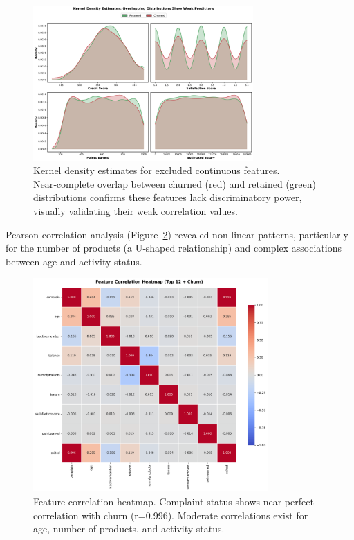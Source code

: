 \documentclass[12pt]{article}
\begin{document}
\begin{figure}[H]
\centering
\includegraphics[width=0.75\textwidth]{../img/poc_kde_plots.png}
\caption{Kernel density estimates for excluded continuous features. Near‑complete overlap between churned (red) and retained (green) distributions confirms these features lack discriminatory power, visually validating their weak correlation values.}
\label{fig:kde_weak}
\end{figure}

Pearson correlation analysis (Figure~\ref{fig:correlation}) revealed non‑linear patterns, particularly for the number of products (a U‑shaped relationship) and complex associations between age and activity status.

\begin{figure}[H]
\centering
\includegraphics[width=0.8\textwidth]{../img/08_correlation_heatmap.png}
\caption{Feature correlation heatmap. Complaint status shows near‑perfect correlation with churn (r=0.996). Moderate correlations exist for age, number of products, and activity status.}
\label{fig:correlation}
\end{figure}
\end{document}
